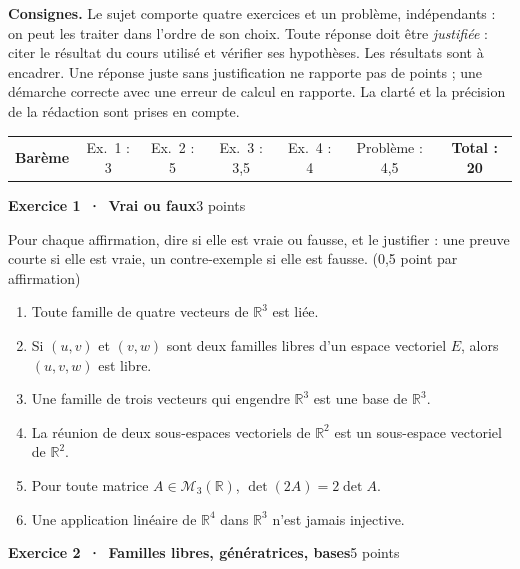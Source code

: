 \documentclass[a4paper,11pt]{article}
\numberwithin{equation}{section}
\numberwithin{figure}{section}
\numberwithin{table}{section}
\theoremstyle{enonce}
\theoremstyle{exemple}
\theoremstyle{remarque}
\newcommand{\R}{\mathbb{R}}
\newcommand{\pts}[1]{\hfill{\footnotesize\sffamily\color{Gris}(#1)}}
\newcommand{\Ex}[3]{\par\needspace{6\baselineskip}\vspace{1.3em}\noindent
  {\sffamily\bfseries\large\color{Bleu}Exercice #1 \,·\, #2}\hfill{\sffamily\small\color{Ocre}#3}\par
  \vspace{2pt}{\color{Filet}\rule{\linewidth}{0.4pt}}\par\smallskip}
\begin{document}
\else
\begin{center}
\begin{tcolorbox}[enhanced,colback=Fond,colframe=Fond,arc=0pt,boxrule=0pt,left=10pt,right=10pt,top=8pt,bottom=8pt,width=\linewidth]
\small
\textbf{\sffamily\color{Bleu}Consignes.} Le sujet comporte quatre exercices et un problème, indépendants : on peut les traiter
dans l'ordre de son choix. Toute réponse doit être \emph{justifiée} : citer le résultat du cours utilisé et vérifier ses
hypothèses. Les résultats sont à encadrer. Une réponse juste sans justification ne rapporte pas de points ; une démarche correcte
avec une erreur de calcul en rapporte. La clarté et la précision de la rédaction sont prises en compte.

\medskip
\begin{tabular}{@{}lcccccc@{}}
\textbf{\sffamily\color{Bleu}Barème} & Ex.~1 : 3 & Ex.~2 : 5 & Ex.~3 : 3,5 & Ex.~4 : 4 & Problème : 4,5 & \textbf{Total : 20}\\
\end{tabular}
\end{tcolorbox}
\end{center}

\Ex{1}{Vrai ou faux}{3 points}
Pour chaque affirmation, dire si elle est vraie ou fausse, et le justifier : une preuve courte si elle est vraie, un
contre-exemple si elle est fausse. \pts{0,5 point par affirmation}
\begin{enumerate}
\item Toute famille de quatre vecteurs de $\R^3$ est liée.
\item Si $(u,v)$ et $(v,w)$ sont deux familles libres d'un espace vectoriel $E$, alors $(u,v,w)$ est libre.
\item Une famille de trois vecteurs qui engendre $\R^3$ est une base de $\R^3$.
\item La réunion de deux sous-espaces vectoriels de $\R^2$ est un sous-espace vectoriel de $\R^2$.
\item Pour toute matrice $A\in\mathcal M_3(\R)$, $\det(2A)=2\det A$.
\item Une application linéaire de $\R^4$ dans $\R^3$ n'est jamais injective.
\end{enumerate}

\Ex{2}{Familles libres, génératrices, bases}{5 points}
\end{document}
